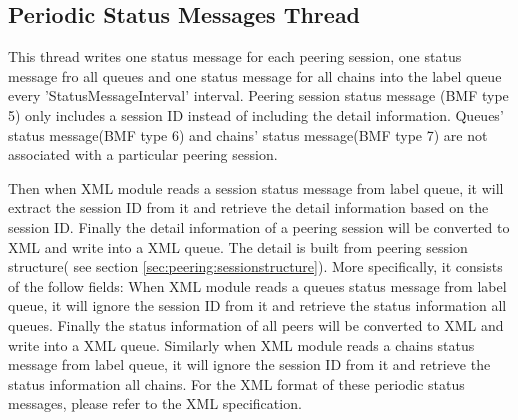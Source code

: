 \subsection{Periodic Status Messages Thread}
This thread writes one status message for each peering session, one status message fro all queues and one status message for all chains into the label queue every 'StatusMessageInterval' interval.  Peering session status message (BMF type 5) only includes a session ID instead of including the detail information. Queues' status message(BMF type 6) and chains' status message(BMF type 7) are not associated with a particular peering session.

Then when XML module reads a session status message from label queue, it will extract the session ID from it and retrieve the detail information based on the session ID. Finally the detail information of a peering session will be converted to XML and write into a XML queue. The detail is built from peering session structure( see section \ref{sec:peering:sessionstructure}).  More specifically, it consists of the follow fields:
When XML module reads a queues status message from label queue, it will ignore the session ID from it and retrieve the status information all queues. Finally the status information of all peers will be converted to XML and write into a XML queue. Similarly when XML module reads a chains status message from label queue, it will ignore the session ID from it and retrieve the status information all chains.
For the XML format of these periodic status messages, please refer to the XML specification.

